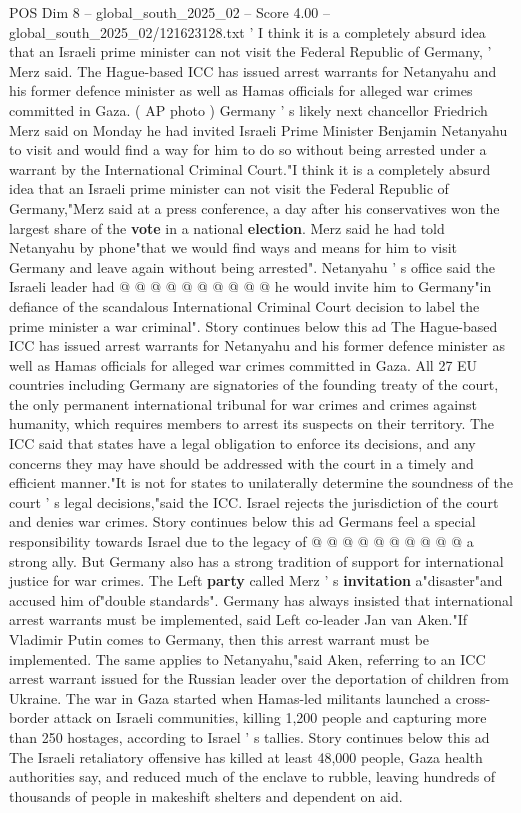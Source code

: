 \begin{textsample}{POS Dim 8 – global\_south\_2025\_02 – Score 4.00 – global\_south\_2025\_02/121623128.txt}  \label{ex:f8_pos_391}
' I think it is a completely absurd idea that an Israeli prime minister can not visit the Federal Republic of Germany, ' Merz said.
The Hague-based ICC has issued arrest warrants for Netanyahu and his former defence minister as well as Hamas officials for alleged war crimes committed in Gaza. ( AP photo ) Germany ' s likely next chancellor Friedrich Merz said on Monday he had invited Israeli Prime Minister Benjamin Netanyahu to visit and would find a way for him to do so without being arrested under a warrant by the International Criminal Court."I think it is a completely absurd idea that an Israeli prime minister can not visit the Federal Republic of Germany,"Merz said at a press conference, a day after his conservatives won the largest share of the \textbf{vote} in a national \textbf{election}.
Merz said he had told Netanyahu by phone"that we would find ways and means for him to visit Germany and leave again without being arrested".
Netanyahu ' s office said the Israeli leader had @ @ @ @ @ @ @ @ @ @ he would invite him to Germany"in defiance of the scandalous International Criminal Court decision to label the prime minister a war criminal".
Story continues below this ad The Hague-based ICC has issued arrest warrants for Netanyahu and his former defence minister as well as Hamas officials for alleged war crimes committed in Gaza.
All 27 EU countries including Germany are signatories of the founding treaty of the court, the only permanent international tribunal for war crimes and crimes against humanity, which requires members to arrest its suspects on their territory.
The ICC said that states have a legal obligation to enforce its decisions, and any concerns they may have should be addressed with the court in a timely and efficient manner."It is not for states to unilaterally determine the soundness of the court ' s legal decisions,"said the ICC.
Israel rejects the jurisdiction of the court and denies war crimes.
Story continues below this ad Germans feel a special responsibility towards Israel due to the legacy of @ @ @ @ @ @ @ @ @ @ a strong ally.
But Germany also has a strong tradition of support for international justice for war crimes.
The Left \textbf{party} called Merz ' s \textbf{invitation} a"disaster"and accused him of"double standards".
Germany has always insisted that international arrest warrants must be implemented, said Left co-leader Jan van Aken."If Vladimir Putin comes to Germany, then this arrest warrant must be implemented.
The same applies to Netanyahu,"said Aken, referring to an ICC arrest warrant issued for the Russian leader over the deportation of children from Ukraine.
The war in Gaza started when Hamas-led militants launched a cross-border attack on Israeli communities, killing 1,200 people and capturing more than 250 hostages, according to Israel ' s tallies.
Story continues below this ad The Israeli retaliatory offensive has killed at least 48,000 people, Gaza health authorities say, and reduced much of the enclave to rubble, leaving hundreds of thousands of people in makeshift shelters and dependent on aid.

\end{textsample}
